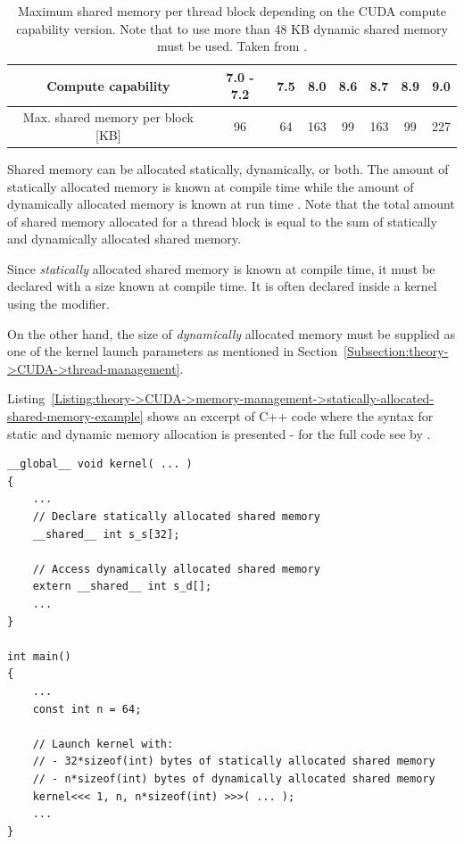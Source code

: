\begin{table}[ht!]
	\centering
	\renewcommand{\arraystretch}{1.5}
	\begin{tabular}{ |c|c|c|c|c|c|c|c| } 
		\hline
		Compute capability 				  & 7.0 - 7.2 & 7.5 & 8.0 & 8.6 & 8.7 & 8.9 & 9.0 \\
		\hline
		Max. shared memory per block [KB] & 96		  & 64  & 163 & 99  & 163 & 99  & 227 \\
		\hline
	\end{tabular}
	\caption{Maximum shared memory per thread block depending on the CUDA compute capability version.
		Note that to use more than 48 KB dynamic shared memory must be used.
		Taken from  \cite{NVIDIADecember2022}.
	}
	\label{Table:theory->CUDA->memory-management->max-shared-memory-per-block-based-on-compute-capability}
\end{table}

Shared memory can be allocated statically, dynamically, or both.
The amount of statically allocated memory is known at compile time while the amount of dynamically allocated memory is known at run time \cite{Harris28January2013}.
Note that the total amount of shared memory allocated for a thread block is equal to the sum of statically and dynamically allocated shared memory.

Since \textit{statically} allocated shared memory is known at compile time, it must be declared with a size known at compile time.
It is often declared inside a kernel using the  modifier.

On the other hand, the size of \textit{dynamically} allocated memory must be supplied as one of the kernel launch parameters as mentioned in Section~\ref{Subsection:theory->CUDA->thread-management}.

Listing~\ref{Listing:theory->CUDA->memory-management->statically-allocated-shared-memory-example} shows an excerpt of C++ code where the syntax for static and dynamic memory allocation is presented - for the full code see  by  \cite{Harris28January2013}.

\begin{lstlisting}[caption={Excerpt of C++ code showcasing the syntax of static and dynamic shared memory allocation.
Note when an array in shared memory is declared using \code{extern}, then the size of the array is determined at run time \cite{NVIDIADecember2022}.
Taken from \citetitle{Harris28January2013} by \citename{Harris28January2013}{author} \cite{Harris28January2013}.},label={Listing:theory->CUDA->memory-management->statically-allocated-shared-memory-example}]
__global__ void kernel( ... )
{
	...
	// Declare statically allocated shared memory
	__shared__ int s_s[32];

	// Access dynamically allocated shared memory
	extern __shared__ int s_d[];
	...
}

int main()
{
	...
	const int n = 64;
	
	// Launch kernel with:
	// - 32*sizeof(int) bytes of statically allocated shared memory
	// - n*sizeof(int) bytes of dynamically allocated shared memory
	kernel<<< 1, n, n*sizeof(int) >>>( ... );
	...
}
\end{lstlisting}

